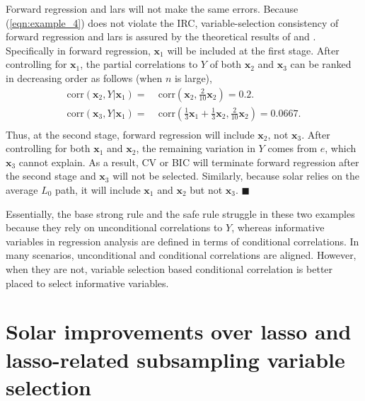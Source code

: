 \documentclass[12pt]{article}
\begin{document}
Forward regression and lars will not make the same errors. Because (\ref{eqn:example_4}) does not violate the IRC, variable-selection consistency of forward regression and lars is assured by the theoretical results of \citet{zhang09} and \citet{zhaoyu06}. Specifically in forward regression, $\mathbf{x}_1$ will be included  at the first stage. After controlling for $\mathbf{x}_1$, the partial correlations to $Y$ of both $\mathbf{x}_2$ and $\mathbf{x}_3$ can be ranked in decreasing order as follows (when $n$ is large),
%
\begin{equation}
  \begin{aligned}
    \mathrm{corr} \left( \mathbf{x}_2, Y \vert \mathbf{x}_1 \right)  = & \;\mathrm{corr} \left( \mathbf{x}_2, \frac{2}{10} \mathbf{x}_2 \right)
    = 0.2. \\
    \mathrm{corr} \left( \mathbf{x}_3, Y \vert \mathbf{x}_1 \right)  = & \;\mathrm{corr} \left( \frac{1}{3} \mathbf{x}_1 + \frac{1}{3} \mathbf{x}_2, \frac{2}{10} \mathbf{x}_2 \right)
    = 0.0667. \\
  \end{aligned}
\end{equation}
%
Thus, at the second stage, forward regression will include $\mathbf{x}_2$, not $\mathbf{x}_3$. After controlling for both $\mathbf{x}_1$ and $\mathbf{x}_2$, the remaining variation in $Y$ comes from $e$, which $\mathbf{x}_3$ cannot explain. As a result, CV or BIC will terminate forward regression after the second stage and $\mathbf{x}_3$ will not be selected. Similarly, because solar relies on the average $L_0$ path, it will include $\mathbf{x}_1$ and $\mathbf{x}_2$ but not $\mathbf{x}_3$. $\blacksquare$

\bigskip
Essentially, the base strong rule and the safe rule struggle in these two examples because they rely on unconditional correlations to $Y$, whereas informative variables in regression analysis are defined in terms of conditional correlations. In many scenarios, unconditional and conditional correlations are aligned. However, when they are not, variable selection based conditional correlation is better placed to select informative variables.


\section{Solar improvements over lasso and lasso-related subsampling variable selection\label{section:comp}}
\end{document}
